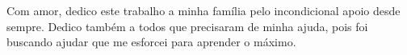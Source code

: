 \begin{dedicatoria}
	\vspace*{\fill}
		Com amor, dedico este trabalho a minha família pelo incondicional apoio desde sempre. Dedico também a todos que precisaram de minha ajuda, pois foi buscando ajudar que me esforcei para aprender o máximo.
	\vspace*{\fill}
\end{dedicatoria}